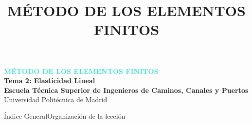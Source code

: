 \documentclass[10pt, aspectratio=43]{beamer}
\title[Elasticidad Lineal]{MÉTODO DE LOS ELEMENTOS FINITOS}
\institute{Universidad Politécnica de Madrid}
\date{}
\begin{document}
\begin{frame}
  \vfill
  \begin{uicard}[borderline north={4.5pt}{0pt}{DarkSlate}, left=16pt, right=16pt, top=22pt, bottom=22pt]
    \centering
    \vspace{0.2cm}
    {\large\bfseries \textcolor{Turquoise}{MÉTODO DE LOS ELEMENTOS FINITOS}}\\[0.7cm]
    
    {\Large \textcolor{DarkSlate}{\textbf{Tema 2: Elasticidad Lineal}}}\\[1.1cm]
    
    {\small \textcolor{TextDark!85}{\textbf{Escuela Técnica Superior de Ingenieros de Caminos, Canales y Puertos}}}\\[0.15cm]
    \textcolor{TextDark!65}{\footnotesize Universidad Politécnica de Madrid}
    \vspace{0.2cm}
  \end{uicard}
  \vfill
\end{frame}

\begin{frame}{Índice General}{Organización de la lección}
  \tableofcontents
\end{frame}

\end{document}
